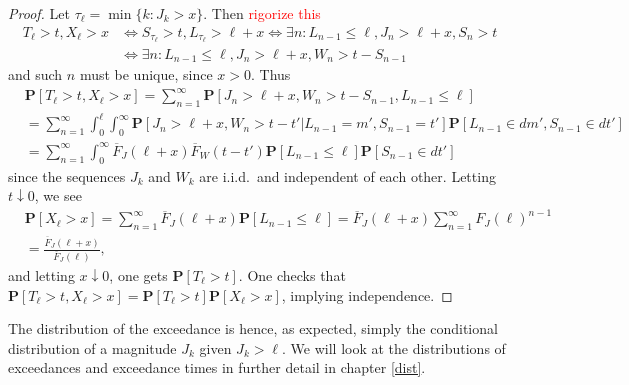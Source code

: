 \documentclass[honours,12pt]{UNSWthesis}
\newcommand{\pr}{\mathbf {P}}
\newcommand{\1}{\mathbf 1}
\numberwithin{equation}{section}
\theoremstyle{definition}
\theoremstyle{remark}
\begin{document}
\begin{proof}
Let $\tau_\ell = \min\{k: J_k > x\}$. Then \textcolor{red}{rigorize this}
\begin{align*}
T_\ell > t, X_\ell > x 
&\Longleftrightarrow
S_{\tau_\ell} > t, L_{\tau_\ell} > \ell + x
\Longleftrightarrow
\exists n: L_{n-1} \le \ell, J_n > \ell + x, S_n > t
\\
&\Longleftrightarrow
\exists n: L_{n-1} \le \ell, J_n > \ell + x, W_n > t - S_{n-1}
\end{align*}
and such $n$ must be unique, since $x > 0$.
Thus 
\begin{align*}
&\pr[T_\ell > t, X_\ell > x]
= \sum_{n=1}^\infty \pr[J_n > \ell + x, W_n > t - S_{n-1}, L_{n-1} \le \ell]
\\
&= \sum_{n=1}^\infty \int_0^\ell \int_0^\infty \pr[J_n > \ell + x, W_n > t - t' | L_{n-1} = m', 
S_{n-1} = t'] \pr[L_{n-1} \in dm', S_{n-1} \in dt']
\\
&= \sum_{n=1}^\infty \int_0^\infty \overline F_J(\ell + x) \overline F_W(t - t')
\pr[L_{n-1} \le \ell] \pr[S_{n-1} \in dt']
\end{align*}
since the sequences $J_k$ and $W_k$ are i.i.d.\ and independent of each other.
Letting $t \downarrow 0$, we see
\begin{align*}
&\pr[X_\ell > x] 
= \sum_{n=1}^\infty \overline F_J(\ell+x) \pr[L_{n-1} \le \ell] 
= \overline F_J(\ell+x) \sum_{n=1}^\infty F_J(\ell)^{n-1}
\\
&= \frac{\overline F_J(\ell + x)}{\overline F_J(\ell)},
\end{align*}
and letting $x \downarrow 0$, one gets $\pr[T_\ell > t]$. 
One checks that $\pr[T_\ell > t, X_\ell > x] = \pr[T_\ell > t] \pr[X_\ell > x]$, implying independence.
\end{proof}
The distribution of the exceedance is hence, as expected, simply the
conditional distribution of a magnitude $J_k$ given $J_k > \ell$. We will look at the distributions of exceedances and exceedance times in further detail in chapter \ref{dist}.
\end{document}
